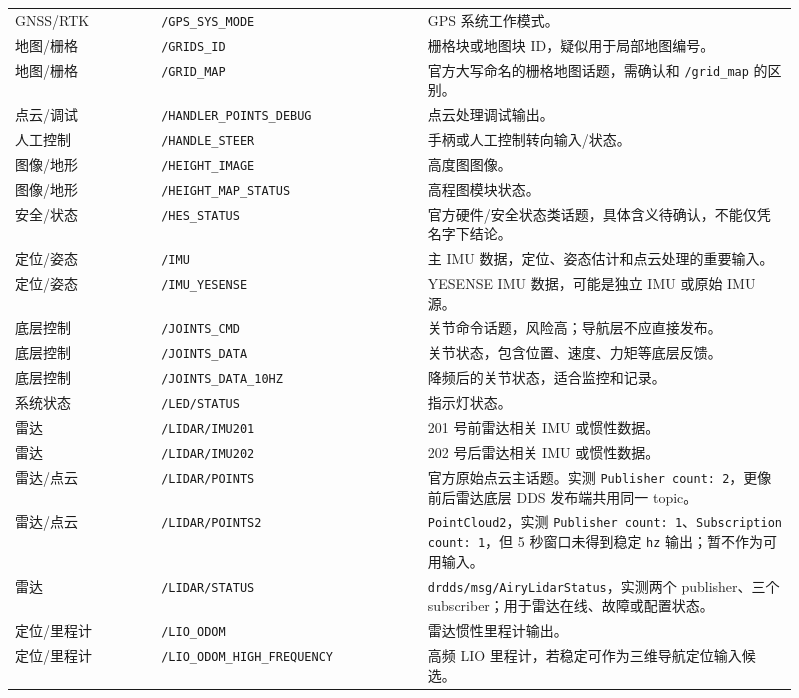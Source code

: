 \documentclass[UTF8,11pt,a4paper]{ctexart}
\begin{document}
{\begin{longtable}{p{0.17\linewidth}p{0.31\linewidth}p{0.43\linewidth}}
GNSS/RTK & \texttt{/GPS\_SYS\_MODE} & GPS 系统工作模式。\\
地图/栅格 & \texttt{/GRIDS\_ID} & 栅格块或地图块 ID，疑似用于局部地图编号。\\
地图/栅格 & \texttt{/GRID\_MAP} & 官方大写命名的栅格地图话题，需确认和 \texttt{/grid\_map} 的区别。\\
点云/调试 & \texttt{/HANDLER\_POINTS\_DEBUG} & 点云处理调试输出。\\
人工控制 & \texttt{/HANDLE\_STEER} & 手柄或人工控制转向输入/状态。\\
图像/地形 & \texttt{/HEIGHT\_IMAGE} & 高度图图像。\\
图像/地形 & \texttt{/HEIGHT\_MAP\_STATUS} & 高程图模块状态。\\
安全/状态 & \texttt{/HES\_STATUS} & 官方硬件/安全状态类话题，具体含义待确认，不能仅凭名字下结论。\\
定位/姿态 & \texttt{/IMU} & 主 IMU 数据，定位、姿态估计和点云处理的重要输入。\\
定位/姿态 & \texttt{/IMU\_YESENSE} & YESENSE IMU 数据，可能是独立 IMU 或原始 IMU 源。\\
底层控制 & \texttt{/JOINTS\_CMD} & 关节命令话题，风险高；导航层不应直接发布。\\
底层控制 & \texttt{/JOINTS\_DATA} & 关节状态，包含位置、速度、力矩等底层反馈。\\
底层控制 & \texttt{/JOINTS\_DATA\_10HZ} & 降频后的关节状态，适合监控和记录。\\
系统状态 & \texttt{/LED/STATUS} & 指示灯状态。\\
雷达 & \texttt{/LIDAR/IMU201} & 201 号前雷达相关 IMU 或惯性数据。\\
雷达 & \texttt{/LIDAR/IMU202} & 202 号后雷达相关 IMU 或惯性数据。\\
雷达/点云 & \texttt{/LIDAR/POINTS} & 官方原始点云主话题。实测 \texttt{Publisher count: 2}，更像前后雷达底层 DDS 发布端共用同一 topic。\\
雷达/点云 & \texttt{/LIDAR/POINTS2} & \texttt{PointCloud2}，实测 \texttt{Publisher count: 1}、\texttt{Subscription count: 1}，但 5 秒窗口未得到稳定 \texttt{hz} 输出；暂不作为可用输入。\\
雷达 & \texttt{/LIDAR/STATUS} & \texttt{drdds/msg/AiryLidarStatus}，实测两个 publisher、三个 subscriber；用于雷达在线、故障或配置状态。\\
定位/里程计 & \texttt{/LIO\_ODOM} & 雷达惯性里程计输出。\\
定位/里程计 & \texttt{/LIO\_ODOM\_HIGH\_FREQUENCY} & 高频 LIO 里程计，若稳定可作为三维导航定位输入候选。\\

\end{longtable}}
\end{document}
